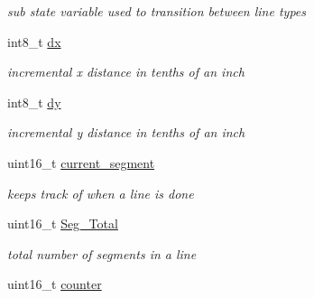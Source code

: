 \begin{DoxyCompactItemize}
\begin{DoxyCompactList}\small\item\em sub state variable used to transition between line types \end{DoxyCompactList}\item 
\hypertarget{classtask__lines_a90808cf8391311e526bf7a647e499afc}{int8\-\_\-t \hyperlink{classtask__lines_a90808cf8391311e526bf7a647e499afc}{dx}}\label{classtask__lines_a90808cf8391311e526bf7a647e499afc}

\begin{DoxyCompactList}\small\item\em incremental x distance in tenths of an inch \end{DoxyCompactList}\item 
\hypertarget{classtask__lines_a0f086520fb9bfd448685708910d06fe1}{int8\-\_\-t \hyperlink{classtask__lines_a0f086520fb9bfd448685708910d06fe1}{dy}}\label{classtask__lines_a0f086520fb9bfd448685708910d06fe1}

\begin{DoxyCompactList}\small\item\em incremental y distance in tenths of an inch \end{DoxyCompactList}\item 
\hypertarget{classtask__lines_a23ff1336daefdf449e36ae03266dfe0e}{uint16\-\_\-t \hyperlink{classtask__lines_a23ff1336daefdf449e36ae03266dfe0e}{current\-\_\-segment}}\label{classtask__lines_a23ff1336daefdf449e36ae03266dfe0e}

\begin{DoxyCompactList}\small\item\em keeps track of when a line is done \end{DoxyCompactList}\item 
\hypertarget{classtask__lines_aa686a708aa641201a447f31d13a4351b}{uint16\-\_\-t \hyperlink{classtask__lines_aa686a708aa641201a447f31d13a4351b}{Seg\-\_\-\-Total}}\label{classtask__lines_aa686a708aa641201a447f31d13a4351b}

\begin{DoxyCompactList}\small\item\em total number of segments in a line \end{DoxyCompactList}\item 
\hypertarget{classtask__lines_ab160679fe7aa75496e0e4a27789cb6d2}{uint16\-\_\-t \hyperlink{classtask__lines_ab160679fe7aa75496e0e4a27789cb6d2}{counter}}\label{classtask__lines_ab160679fe7aa75496e0e4a27789cb6d2}


\end{DoxyCompactItemize}
